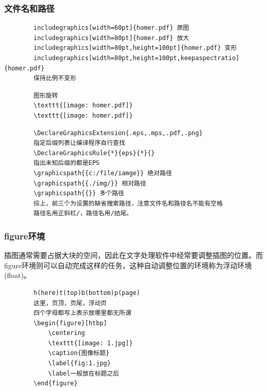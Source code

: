 \documentclass[16pt]{article}
\begin{document}
\subsubsection{文件名和路径}
    \begin{lstlisting}
        includegraphics[width=60pt]{homer.pdf} 原图
        includegraphics[width=80pt]{homer.pdf} 放大
        includegraphics[width=80pt,height=100pt]{homer.pdf} 变形
        includegraphics[width=80pt,height=100pt,keepaspectratio]{homer.pdf} 
        保持比例不变形
    \end{lstlisting}
    \begin{lstlisting}
        图形旋转
        \texttt{[image: homer.pdf]}
        \texttt{[image: homer.pdf]}
    \end{lstlisting}
    \begin{lstlisting}
        \DeclareGraphicsExtension{.eps,.mps,.pdf,.png}
        指定后缀列表让编译程序自行查找
        \DeclareGraphicsRule{*}{eps}{*}{}
        指出未知后缀的都是EPS
        \graphicspath{{c:/file/iamge}} 绝对路径
        \graphicspath{{./img/}} 相对路径
        \graphicspath{{}} 多个路径
        综上，前三个为设置的缺省搜索路径，注意文件名和路径名不能有空格
        路径名用正斜杠/，路径名用/结尾。
    \end{lstlisting}
\subsubsection{figure环境}
    插图通常需要占据大块的空间，因此在文字处理软件中经常要调整插图的位置。而figure环境则可以自动完成这样的任务，这种自动调整位置的环境称为浮动环境(float)。 \par
    \begin{lstlisting}
        h(here)t(top)b(bottom)p(page)
        这里，页顶，页尾，浮动页
        四个字母都写上表示放哪里都无所谓
        \begin{figure}[htbp]
            \centering
            \texttt{[image: 1.jpg]}
            \caption{图像标题}
            \label{fig:1.jpg}
            \label一般放在标题之后
        \end{figure}
    \end{lstlisting}
\end{document}
